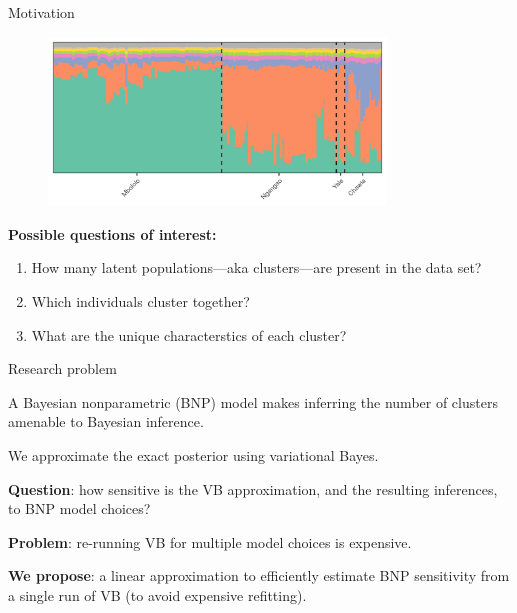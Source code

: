 \begin{frame}{Motivation}

\begin{figure}[!h]
\centering
\includegraphics[width = 0.8\textwidth]{./figures/structure_example.png}
\end{figure}

\vspace{-1em}

{\bf Possible questions of interest: }

\begin{enumerate}
    \item How many latent populations---aka clusters---are present in the data set?
    \pause
    \item Which individuals cluster together?
    \pause
    \item What are the unique characterstics of each cluster?
\end{enumerate}


\end{frame}
\begin{frame}{Research problem}

A Bayesian nonparametric (BNP) model makes inferring the number of clusters amenable to
Bayesian inference.

\pause

We approximate the exact posterior using variational Bayes.

\pause

\textbf{Question}: how sensitive is the VB approximation, and the resulting
inferences, to BNP model choices?

\pause

\textbf{Problem}: re-running VB for multiple model choices is expensive.

\pause

\textbf{We propose}: a linear approximation to efficiently
estimate BNP sensitivity from a single run of VB (to avoid
expensive refitting).

\end{frame}

